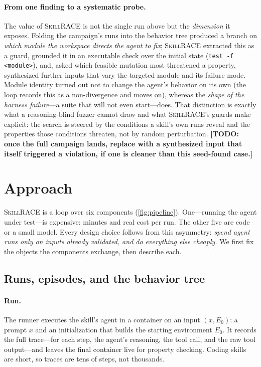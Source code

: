 \documentclass[acmsmall,screen,review,anonymous]{acmart}
\newcommand{\todo}[1]{{\color{purple}\textbf{[TODO: #1]}}}
\newcommand{\tool}{\textsc{SkillRACE}\xspace}
\begin{document}
\paragraph{From one finding to a systematic probe.} The value of \tool is not the single
run above but the \emph{dimension} it exposes. Folding the campaign's runs into the
behavior tree produced a branch on \emph{which module the workspace directs the agent to
fix}; \tool extracted this as a guard, grounded it in an executable check over the initial
state (\texttt{test -f <module>}), and, asked which feasible mutation most threatened a
property, synthesized further inputs that vary the targeted module and its failure mode.
Module identity turned out not to change the agent's behavior on its own (the loop records
this as a non-divergence and moves on), whereas the \emph{shape of the harness failure}---a
suite that will not even start---does. That distinction is exactly what a reasoning-blind
fuzzer cannot draw and what \tool's guards make explicit: the search is steered by the
conditions a skill's own runs reveal and the properties those conditions threaten, not by
random perturbation. \todo{once the full campaign lands, replace with a synthesized input
that itself triggered a violation, if one is cleaner than this seed-found case.}

\section{Approach}
\label{sec:approach}

\tool is a loop over six components (\cref{fig:pipeline}). One---running the agent under
test---is expensive: minutes and real cost per run. The other five are code or a small
model. Every design choice follows from this asymmetry: \emph{spend agent runs only on
inputs already validated, and do everything else cheaply.} We first fix the objects the
components exchange, then describe each.

\subsection{Runs, episodes, and the behavior tree}
\label{sec:objects}

\paragraph{Run.} The runner executes the skill's agent in a container on an input
\((x, E_0)\): a prompt \(x\) and an initialization that builds the starting environment
\(E_0\). It records the full trace---for each step, the agent's reasoning, the tool call,
and the raw tool output---and leaves the final container live for property checking.
Coding skills are short, so traces are tens of steps, not thousands.
\end{document}

